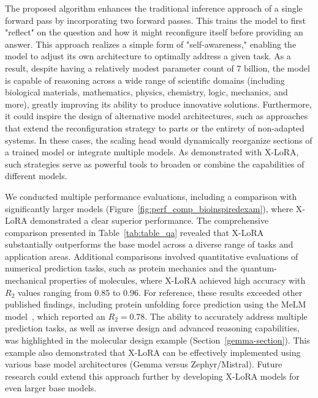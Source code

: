 The proposed algorithm enhances the traditional inference approach of a single forward pass by incorporating two forward passes. This trains the model to first "reflect" on the question and how it might reconfigure itself before providing an answer. This approach realizes a simple form of "self-awareness," enabling the model to adjust its own architecture to optimally address a given task. As a result, despite having a relatively modest parameter count of 7 billion, the model is capable of reasoning across a wide range of scientific domains (including biological materials, mathematics, physics, chemistry, logic, mechanics, and more), greatly improving its ability to produce innovative solutions. Furthermore, it could inspire the design of alternative model architectures, such as approaches that extend the reconfiguration strategy to parts or the entirety of non-adapted systems. In these cases, the scaling head would dynamically reorganize sections of a trained model or integrate multiple models. As demonstrated with X-LoRA, such strategies serve as powerful tools to broaden or combine the capabilities of different models.

We conducted multiple performance evaluations, including a comparison with significantly larger models (Figure~\ref{fig:perf_comp_bioinspiredexam}), where X-LoRA demonstrated a clear superior performance. The comprehensive comparison presented in Table~\ref{tab:table_qa} revealed that X-LoRA substantially outperforms the base model across a diverse range of tasks and application areas. Additional comparisons involved quantitative evaluations of numerical prediction tasks, such as protein mechanics and the quantum-mechanical properties of molecules, where X-LoRA achieved high accuracy with $R_2$ values ranging from 0.85 to 0.96. For reference, these results exceeded other published findings, including protein unfolding force prediction using the MeLM model~\cite{Buehler2023MeLMProblemsb}, which reported an $R_2=0.78$. The ability to accurately address multiple prediction tasks, as well as inverse design and advanced reasoning capabilities, was highlighted in the molecular design example (Section~\ref{gemma-section}). This example also demonstrated that X-LoRA can be effectively implemented using various base model architectures (Gemma versus Zephyr/Mistral). Future research could extend this approach further by developing X-LoRA models for even larger base models.

